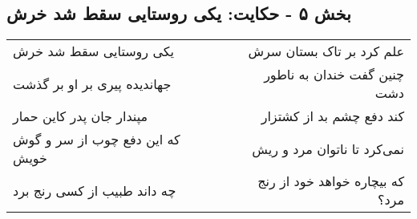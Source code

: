 \begin{center}
\section*{بخش ۵ - حکایت: یکی روستایی سقط شد خرش}
\label{sec:005}
\begin{longtable}{l p{0.5cm} r}
یکی روستایی سقط شد خرش
&&
علم کرد بر تاک بستان سرش
\\
جهاندیده پیری بر او بر گذشت
&&
چنین گفت خندان به ناطور دشت
\\
مپندار جان پدر کاین حمار
&&
کند دفع چشم بد از کشتزار
\\
که این دفع چوب از سر و گوش خویش
&&
نمی‌کرد تا ناتوان مرد و ریش
\\
چه داند طبیب از کسی رنج برد
&&
که بیچاره خواهد خود از رنج مرد؟
\\
\end{longtable}
\end{center}
